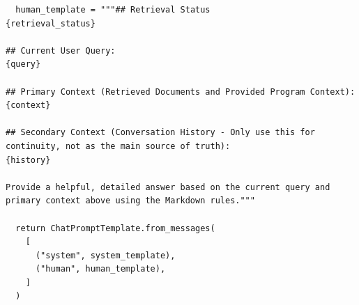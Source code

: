 \begin{verbatim}
  human_template = """## Retrieval Status
{retrieval_status}

## Current User Query:
{query}

## Primary Context (Retrieved Documents and Provided Program Context):
{context}

## Secondary Context (Conversation History - Only use this for continuity, not as the main source of truth):
{history}

Provide a helpful, detailed answer based on the current query and primary context above using the Markdown rules."""

  return ChatPromptTemplate.from_messages(
    [
      ("system", system_template),
      ("human", human_template),
    ]
  )
\end{verbatim}
\label{listing:appendix:synthesis_prompt}